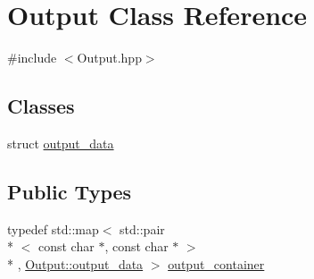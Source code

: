 \hypertarget{classOutput}{\section{Output Class Reference}
\label{classOutput}
}


{\ttfamily \#include $<$Output.\-hpp$>$}

\subsection*{Classes}
\begin{DoxyCompactItemize}
\item 
struct \hyperlink{structOutput_1_1output__data}{output\-\_\-data}
\end{DoxyCompactItemize}
\subsection*{Public Types}
\begin{DoxyCompactItemize}
\item 
typedef std\-::map$<$ std\-::pair\\*
$<$ const char $\ast$, const char $\ast$ $>$\\*
, \hyperlink{structOutput_1_1output__data}{Output\-::output\-\_\-data} $>$ \hyperlink{classOutput_a579e71138176ba949f09d507e791ac68}{output\-\_\-container}
\end{DoxyCompactItemize}
